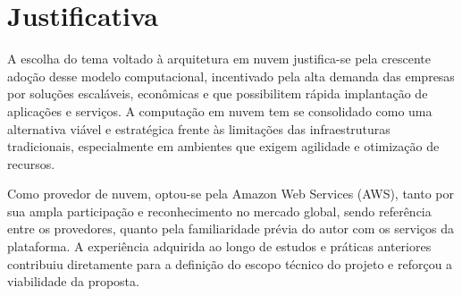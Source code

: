 \section{Justificativa}
\label{sec:intro:jus}
A escolha do tema voltado à arquitetura em nuvem justifica-se pela crescente adoção desse modelo computacional, incentivado pela alta demanda das empresas por soluções escaláveis, econômicas e que possibilitem rápida implantação de aplicações e serviços. A computação em nuvem tem se consolidado como uma alternativa viável e estratégica frente às limitações das infraestruturas tradicionais, especialmente em ambientes que exigem agilidade e otimização de recursos.

Como provedor de nuvem, optou-se pela Amazon Web Services (AWS), tanto por sua ampla participação e reconhecimento no mercado global, sendo referência entre os provedores, quanto pela familiaridade prévia do autor com os serviços da plataforma. A experiência adquirida ao longo de estudos e práticas anteriores contribuiu diretamente para a definição do escopo técnico do projeto e reforçou a viabilidade da proposta.

